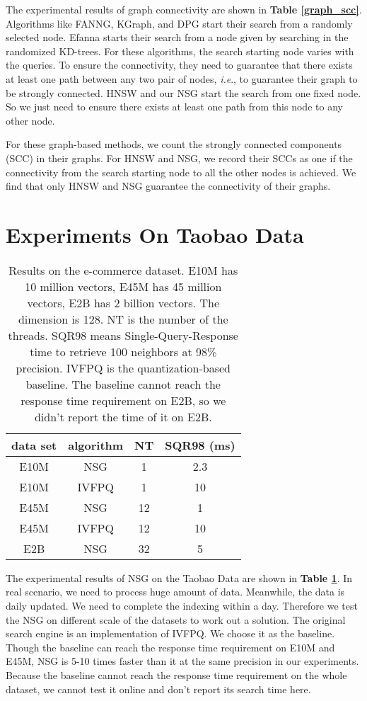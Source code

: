 \documentclass{vldb}
\def\ie {\emph{i.e}.} \def\Ie{\emph{I.e}.}
\begin{document}
\begin{appendix}
The experimental results of graph connectivity are shown in \textbf{Table \ref{graph_scc}}. Algorithms like FANNG, KGraph, and DPG start their search from a randomly selected node. Efanna starts their search from a node given by searching in the randomized KD-trees. For these algorithms, the search starting node varies with the queries. To ensure the connectivity, they need to guarantee that there exists at least one path between any two pair of nodes, \ie, to guarantee their graph to be strongly connected. HNSW and our NSG start the search from one fixed node. So we just need to ensure there exists at least one path from this node to any other node. 

For these graph-based methods, we count the strongly connected components (SCC) in their graphs. For HNSW and NSG, we record their SCCs as one if the connectivity from the search starting node to all the other nodes is achieved. We find that only HNSW and NSG guarantee the connectivity of their graphs. 



\section{Experiments On Taobao Data}

\begin{table}[t]\scriptsize
\caption{Results on the e-commerce dataset. E10M has 10 million vectors, E45M has 45 million vectors, E2B has 2 billion vectors. The dimension is 128. NT is the number of the threads. SQR98 means Single-Query-Response time to retrieve 100 neighbors at 98\% precision. IVFPQ is the quantization-based baseline. The baseline cannot reach the response time requirement on E2B, so we didn't report the time of it on E2B.}
\label{e-commerce}
\centering
\begin{tabular}{|c|c|c|c|}
\hline
data set & algorithm  & NT & SQR98 (ms)\\
\hline
E10M &  NSG & 1 & 2.3 \\
E10M &  IVFPQ & 1 & 10 \\
E45M &  NSG & 12 & 1 \\
E45M &  IVFPQ & 12 & 10 \\
E2B &  NSG & 32 & 5 \\
\hline
\end{tabular}
\end{table}
The experimental results of NSG on the Taobao Data are shown in \textbf{Table \ref{e-commerce}}. In real scenario, we need to process huge amount of data. Meanwhile, the data is daily updated. We need to complete the indexing within a day. Therefore we test the NSG on different scale of the datasets to work out a solution. The original search engine is an implementation of IVFPQ. We choose it as the baseline. Though the baseline can reach the response time requirement on E10M and E45M, NSG is 5-10 times faster than it at the same precision in our experiments. Because the baseline cannot reach the response time requirement on the whole dataset, we cannot test it online and don't report its search time here. 


\end{appendix}
\end{document}
